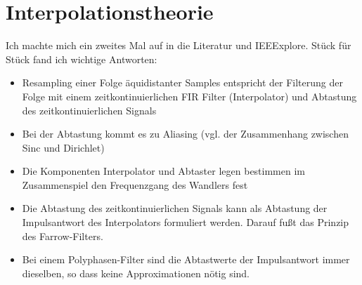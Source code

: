 \documentclass[11pt]{article}
\begin{document}
\section{Interpolationstheorie}

Ich machte mich ein zweites Mal auf in die Literatur und IEEExplore. Stück für Stück fand ich wichtige Antworten:

\begin{itemize}
	\item Resampling einer Folge äquidistanter Samples entspricht der Filterung der Folge mit einem zeitkontinuierlichen FIR Filter (Interpolator) und Abtastung des zeitkontinuierlichen Signals
	\item Bei der Abtastung kommt es zu Aliasing (vgl. der Zusammenhang zwischen Sinc und Dirichlet) 
	\item Die Komponenten Interpolator und Abtaster legen bestimmen im Zusammenspiel den Frequenzgang des Wandlers fest
	\item Die Abtastung des zeitkontinuierlichen Signals kann als Abtastung der Impulsantwort des Interpolators formuliert werden. Darauf fußt das Prinzip des Farrow-Filters.
	\item Bei einem Polyphasen-Filter sind die Abtastwerte der Impulsantwort immer dieselben, so dass keine Approximationen nötig sind.
\end{itemize}
\end{document}
